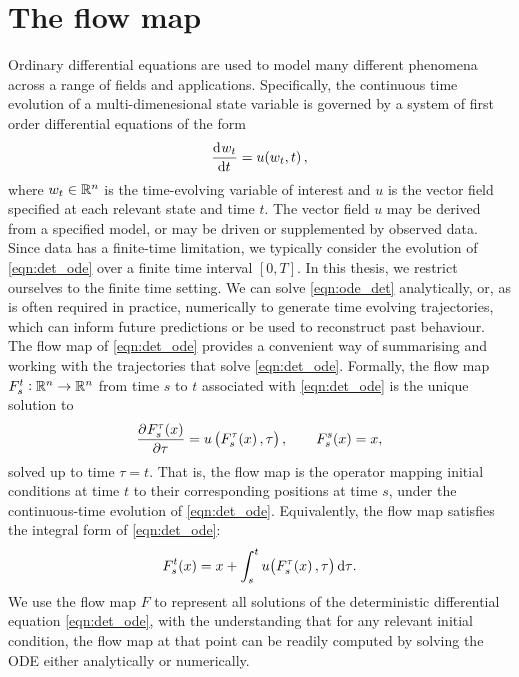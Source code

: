 \section{The flow map}
Ordinary differential equations are used to model many different phenomena across a range of fields and applications.
Specifically, the continuous time evolution of a multi-dimenesional state variable is governed by a system of first order differential equations of the form
\begin{equation}\label{eqn:det_ode}
	\dod{w_t}{t} = u\!\left(w_t, t\right),
\end{equation}
where \(w_t \in \mathbb{R}^n\) is the time-evolving variable of interest and \(u\) is the vector field specified at each relevant state and time \(t\).
The vector field \(u\) may be derived from a specified model, or may be driven or supplemented by observed data.
Since data has a finite-time limitation, we typically consider the evolution of \cref{eqn:det_ode} over a finite time interval \([0,T]\).
In this thesis, we restrict ourselves to the finite time setting.
We can solve \cref{eqn:ode_det} analytically, or, as is often required in practice, numerically to generate time evolving trajectories, which can inform future predictions or be used to reconstruct past behaviour.
The flow map of \cref{eqn:det_ode} provides a convenient way of summarising and working with the trajectories that solve \cref{eqn:det_ode}.
Formally, the flow map \(F_{s}^{t}: \mathbb{R}^n \to \mathbb{R}^n\) from time \(s\) to \(t\) associated with \cref{eqn:det_ode} is the unique solution to
\begin{equation}
	\dpd{F_{s}^{\tau}\!\left(x\right)}{\tau} = u\left(F_{s}^\tau\!\left(x\right), \tau\right), \qquad F_{s}^{s}\!\left(x\right) = x,
	\label{eqn:flow_map_ode}
\end{equation}
solved up to time \(\tau = t\).
That is, the flow map is the operator mapping initial conditions at time \(t\) to their corresponding positions at time \(s\), under the continuous-time evolution of \cref{eqn:det_ode}.
Equivalently, the flow map satisfies the integral form of \cref{eqn:det_ode}:
\begin{equation}\label{eqn:flow_map_int}
	F_s^t\!\left(x\right) = x + \int_s^t{u\!\left(F_s^{\tau}\!\left(x\right), \tau\right)\dif \tau}.
\end{equation}
We use the flow map \(F\) to represent all solutions of the deterministic differential equation \cref{eqn:det_ode}, with the understanding that for any relevant initial condition, the flow map at that point can be readily computed by solving the ODE either analytically or numerically.

